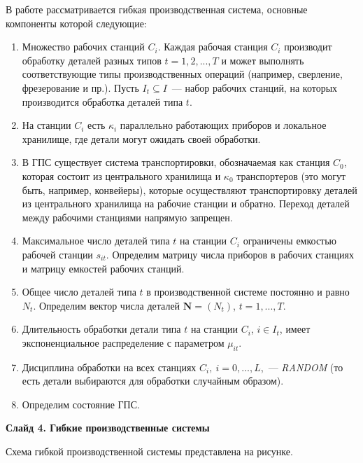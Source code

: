 \documentclass[a4paper,14pt]{extarticle}
\theoremstyle{note}
\begin{document}
В работе рассматривается гибкая производственная система, основные компоненты которой следующие:
\begin{enumerate}
\item Множество рабочих станций $C_i$. Каждая рабочая станция $C_i$ производит обработку деталей разных типов $t=1,2,...,T$ и может выполнять соответствующие типы производственных операций (например, сверление, фрезерование и пр.). Пусть $I_t \subseteq I$~--- набор рабочих станций, на которых производится обработка деталей типа $t$.

\item На станции $C_i$ есть $\kappa_i$ параллельно работающих приборов и локальное хранилище, где детали могут ожидать своей обработки. 

\item В ГПС существует система транспортировки, обозначаемая как станция $C_0$, которая состоит из центрального хранилища и $\kappa_0$ транспортеров (это могут быть, например, конвейеры), которые осуществляют транспортировку деталей из центрального хранилища на рабочие станции и обратно. Переход деталей между рабочими станциями напрямую запрещен.

\item Максимальное число деталей типа $t$ на станции $C_i$ ограничены емкостью рабочей станции $s_{it}$. Определим матрицу числа приборов в рабочих станциях и матрицу емкостей рабочих станций.

\item Общее число деталей типа $t$ в производственной системе постоянно и равно $N_t$. Определим вектор числа деталей $\mathbf{N}=(N_t)$, $t=1,...,T$.

\item Длительность обработки детали типа $t$ на станции $C_i$, $i \in I_t$, имеет экспоненциальное распределение с параметром $\mu_{it}$.

\item Дисциплина обработки на всех станциях $C_i,~i=0,...,L$,~--- \textit{RANDOM} (то есть детали выбираются для обработки случайным образом).

\item Определим состояние ГПС.
\end{enumerate}


\textbf{Слайд 4. Гибкие производственные системы}

Схема гибкой производственной системы представлена на рисунке.
\end{document}
